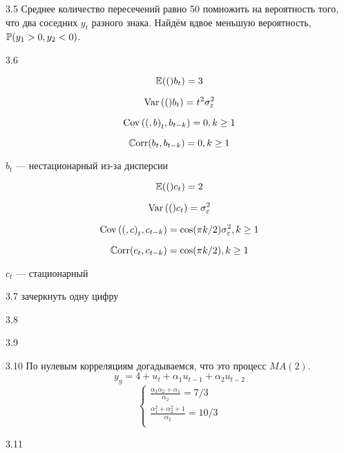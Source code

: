 \protect \hypertarget {soln:3.5}{}
\begin{solution}{{3.5}}
Среднее количество пересечений равно 50 помножить на вероятность того, что два соседних $y_t$ разного знака. Найдём вдвое меньшую вероятность, $\P(y_1>0, y_2 <0)$.
\end{solution}
\protect \hypertarget {soln:3.6}{}
\begin{solution}{{3.6}}

\[
\E(b_t) = 3
\]

\[
\Var(b_t) = t^2 \sigma^2_{\e}
\]

\[
\Cov(b_t, b_{t-k}) = 0, k \geq 1
\]

\[
\Corr(b_t, b_{t-k}) = 0, k \geq 1
\]

$b_t$ — нестационарный из-за дисперсии


\[
\E(c_t) = 2
\]

\[
\Var(c_t) = \sigma^2_{\e}
\]

\[
\Cov(c_t, c_{t-k}) = \cos( \pi k /2)\sigma^2_{\e}, k \geq 1
\]

\[
\Corr(c_t, c_{t-k}) = \cos( \pi k /2), k \geq 1
\]

$c_t$ — стационарный
\end{solution}
\protect \hypertarget {soln:3.7}{}
\begin{solution}{{3.7}}
зачеркнуть одну цифру
\end{solution}
\protect \hypertarget {soln:3.8}{}
\begin{solution}{{3.8}}
\end{solution}
\protect \hypertarget {soln:3.9}{}
\begin{solution}{{3.9}}
\end{solution}
\protect \hypertarget {soln:3.10}{}
\begin{solution}{{3.10}}
По нулевым корреляциям догадываемся, что это процесс $MA(2)$.
\[
y_y = 4 + u_t + \alpha_1 u_{t-1} + \alpha_2 u_{t-2}
\]
\[
\begin{cases}
  \frac{\alpha_1 \alpha_2 + \alpha_1}{\alpha_2} = 7/3 \\
  \frac{\alpha_1^2 + \alpha_2^2 + 1}{\alpha_2} = 10/3 \\
\end{cases}
\]


\end{solution}
\protect \hypertarget {soln:3.11}{}
\begin{solution}{{3.11}}
\end{solution}
\protect \hypertarget {soln:3.12}{}
